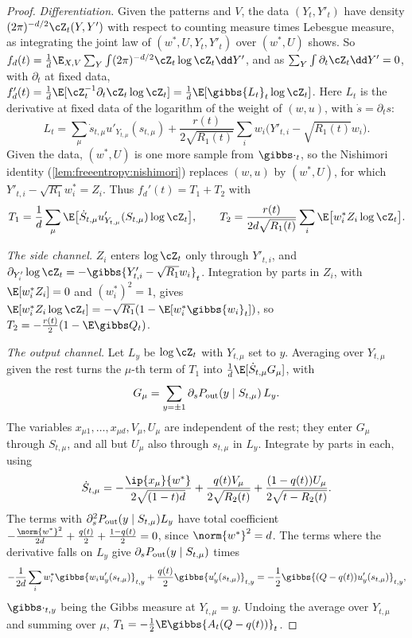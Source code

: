 \begin{refsection}
\begin{proof}
\emph{Differentiation.} Given the patterns and $V$, the data $(Y_t,Y'_t)$ have density $(2\pi)^{-d/2}\cZ_t(Y,Y')$ with respect to counting measure times Lebesgue measure, as integrating the joint law of $(w^*,U,Y_t,Y'_t)$ over $(w^*,U)$ shows. So $f_d(t)=\frac1d\E_{X,V}\sum_Y\int(2\pi)^{-d/2}\cZ_t\log\cZ_t\dd Y'$, and as $\sum_Y\int\partial_t\cZ_t\dd Y'=0$, with $\partial_t$ at fixed data, $f_d'(t)=\frac1d\E[\cZ_t^{-1}\partial_t\cZ_t\log\cZ_t]=\frac1d\E[\gibbs{L_t}_t\log\cZ_t]$. Here $L_t$ is the derivative at fixed data of the logarithm of the weight of $(w,u)$, with $\dot s=\partial_ts$:
\[
L_t=\sum_\mu\dot s_{t,\mu}u'_{Y_{t,\mu}}(s_{t,\mu})+\frac{r(t)}{2\sqrt{R_1(t)}}\sum_iw_i\bigl(Y'_{t,i}-\sqrt{R_1(t)}w_i\bigr).
\]
Given the data, $(w^*,U)$ is one more sample from $\gibbs\cdot_t$, so the Nishimori identity (\cref{lem:freeentropy:nishimori}) replaces $(w,u)$ by $(w^*,U)$, for which $Y'_{t,i}-\sqrt{R_1}w^*_i=Z_i$. Thus $f_d'(t)=T_1+T_2$ with
\[
T_1=\frac1d\sum_\mu\E\bigl[\dot S_{t,\mu}u'_{Y_{t,\mu}}(S_{t,\mu})\log\cZ_t\bigr],\qquad T_2=\frac{r(t)}{2d\sqrt{R_1(t)}}\sum_i\E\bigl[w^*_iZ_i\log\cZ_t\bigr].
\]

\emph{The side channel.} $Z_i$ enters $\log\cZ_t$ only through $Y'_{t,i}$, and $\partial_{Y'_i}\log\cZ_t=-\gibbs{Y'_{t,i}-\sqrt{R_1}w_i}_t$. Integration by parts in $Z_i$, with $\E[w_i^*Z_i]=0$ and $(w_i^*)^2=1$, gives $\E[w^*_iZ_i\log\cZ_t]=-\sqrt{R_1}(1-\E[w^*_i\gibbs{w_i}_t])$, so $T_2=-\frac{r(t)}2(1-\E\gibbs Q_t)$.

\emph{The output channel.} Let $L_y$ be $\log\cZ_t$ with $Y_{t,\mu}$ set to $y$. Averaging over $Y_{t,\mu}$ given the rest turns the $\mu$-th term of $T_1$ into $\frac1d\E[\dot S_{t,\mu}G_\mu]$, with
\[
G_\mu=\sum_{y=\pm1}\partial_sP_{\mathrm{out}}(y\mid S_{t,\mu})\,L_y.
\]
The variables $x_{\mu1},\dots,x_{\mu d},V_\mu,U_\mu$ are independent of the rest; they enter $G_\mu$ through $S_{t,\mu}$, and all but $U_\mu$ also through $s_{t,\mu}$ in $L_y$. Integrate by parts in each, using
\[
\dot S_{t,\mu}=-\frac{\ip{x_\mu}{w^*}}{2\sqrt{(1-t)d}}+\frac{q(t)V_\mu}{2\sqrt{R_2(t)}}+\frac{(1-q(t))U_\mu}{2\sqrt{t-R_2(t)}}.
\]
The terms with $\partial_s^2P_{\mathrm{out}}(y\mid S_{t,\mu})L_y$ have total coefficient $-\frac{\norm{w^*}^2}{2d}+\frac{q(t)}2+\frac{1-q(t)}2=0$, since $\norm{w^*}^2=d$. The terms where the derivative falls on $L_y$ give $\partial_sP_{\mathrm{out}}(y\mid S_{t,\mu})$ times
\[
-\frac1{2d}\sum_iw^*_i\gibbs{w_iu'_y(s_{t,\mu})}_{t,y}+\frac{q(t)}2\gibbs{u'_y(s_{t,\mu})}_{t,y}=-\frac12\gibbs{(Q-q(t))u'_y(s_{t,\mu})}_{t,y},
\]
$\gibbs\cdot_{t,y}$ being the Gibbs measure at $Y_{t,\mu}=y$. Undoing the average over $Y_{t,\mu}$ and summing over $\mu$, $T_1=-\frac12\E\gibbs{A_t(Q-q(t))}_t$.


\end{proof}
\end{refsection}
